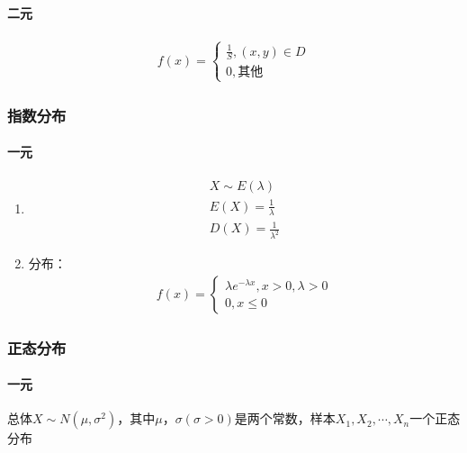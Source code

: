 \documentclass[12pt]{book}
\begin{document}
\paragraph{二元}

\begin{gather*}
    f(x) = \begin{cases}
        \frac{1}{S}, (x,y)\in D \\
        0, \text{其他}
    \end{cases}
\end{gather*}


\subsubsection{指数分布}


\paragraph{一元}

\begin{enumerate}[1.]
    \item \begin{gather*}
              X\sim E(\lambda) \\
              E(X)=\frac{1}{\lambda} \\
              D(X)=\frac{1}{\lambda^2}
          \end{gather*}
    \item 分布：
          \begin{gather*}
              f(x)=\begin{cases}
                  \lambda e^{-\lambda x}, x>0, λ>0 \\
                  0, x\leq 0
              \end{cases}
          \end{gather*}
\end{enumerate}






\subsubsection{正态分布}



\paragraph{一元} 

总体$X\sim N(\mu,\sigma^2)$，其中$\mu$，$\sigma(\sigma>0)$是两个常数，样本$X_1,X_2,\cdots,X_n$一个正态分布
\end{document}
